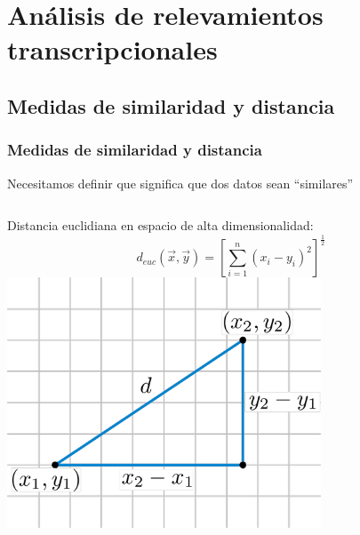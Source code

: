 \documentclass[serif,9pt, t]{beamer}
\begin{document}
\begin{frame}
\begin{columns}[T]
	\end{columns}
\end{frame}

\section{Análisis de relevamientos transcripcionales}

\subsection{Medidas de similaridad y distancia}
\begin{frame} \frametitle{Medidas de similaridad y distancia} 
\centering
Necesitamos definir que significa que dos datos sean ``similares''\bigskip
\begin{columns}[T]
	Distancia euclidiana en espacio de alta dimensionalidad:\\
	\begin{equation}
		d_{euc}(\vec{x}, \vec{y}) = [\sum\limits_{i=1}^n (x_i-y_i)^2]^\frac{1}{2}
	\end{equation}
	\bigskip
	\centering
	\includegraphics[width=0.7\textwidth]{distancia_euclidiana}


\end{columns}
\end{frame}
\end{document}
